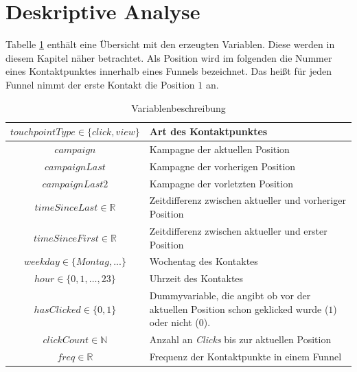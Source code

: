 \section{Deskriptive  Analyse}\label{descriptiv}

Tabelle \ref{varbeschreibung} enthält eine Übersicht mit den erzeugten Variablen. Diese werden in diesem Kapitel näher betrachtet. Als Position wird im folgenden die Nummer eines Kontaktpunktes innerhalb eines Funnels bezeichnet. Das heißt für jeden Funnel nimmt der erste Kontakt die Position $1$ an.
\begin{table}[H]
    \begin{center}
\begin{tabular}{|c|p{10cm}|}
    \hline $ touchpointType \in\{click,view\} $  & Art des Kontaktpunktes\\
		\hline $ campaign $ & Kampagne der aktuellen Position\\ 
    \hline $ campaignLast $ & Kampagne der vorherigen Position\\ 
    \hline $ campaignLast2 $  & Kampagne der vorletzten Position\\
    \hline $ timeSinceLast \in \mathbb{R}$  & Zeitdifferenz zwischen aktueller und vorheriger Position\\
    \hline $ timeSinceFirst \in \mathbb{R} $ & Zeitdifferenz zwischen aktueller und erster Position\\
    \hline $ weekday \in \{Montag,...\}$ & Wochentag des Kontaktes  \\
    \hline $ hour \in \{0,1,\dots, 23\} $  & Uhrzeit des Kontaktes \\
    \hline $ hasClicked\in\{0,1\} $  & Dummyvariable, die angibt ob vor der aktuellen Position schon geklicked wurde ($1$) oder nicht ($0$). \\
    \hline $ clickCount \in \mathbb{N} $ & Anzahl an \textit{Clicks} bis zur aktuellen Position\\
    \hline$ freq \in \mathbb{R} $ & Frequenz der Kontaktpunkte in einem Funnel\\
    \hline
\end{tabular} 
 \end{center}
 \caption{Variablenbeschreibung}\label{varbeschreibung}
\end{table}

